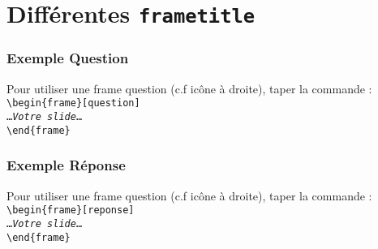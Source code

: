 \documentclass[aspectratio=169]{beamer}
\begin{document}
\section{Différentes \texttt{frametitle}}
\begin{frame}[question]
    \frametitle{Exemple \og Question\fg}

Pour utiliser une frame question (c.f icône à droite), taper la commande :
\noindent\texttt{%
\textbackslash begin\{frame\}[question]\\
\ldots\emph{Votre slide}\ldots\\
\textbackslash end\{frame\}
}
\end{frame}

\begin{frame}[reponse]
    \frametitle{Exemple \og Réponse\fg}

Pour utiliser une frame question (c.f icône à droite), taper la commande :
\noindent\texttt{%
\textbackslash begin\{frame\}[reponse]\\
\ldots\emph{Votre slide}\ldots\\
\textbackslash end\{frame\}
}
\end{frame}
\end{document}

